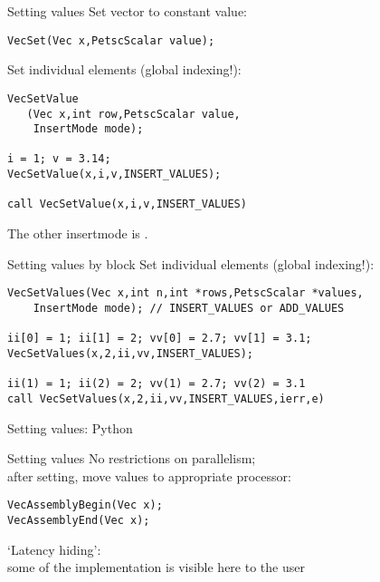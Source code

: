 \begin{numberedframe}{Setting values}
\small
Set vector to constant value:
\begin{lstlisting}
VecSet(Vec x,PetscScalar value);
\end{lstlisting}
Set individual elements (global indexing!):
\lstset{language=Fortran}
\begin{lstlisting}
VecSetValue
   (Vec x,int row,PetscScalar value,
    InsertMode mode);

i = 1; v = 3.14;
VecSetValue(x,i,v,INSERT_VALUES);

call VecSetValue(x,i,v,INSERT_VALUES)
\end{lstlisting}
The other insertmode is .
\end{numberedframe}

\lstset{language=C}

\begin{numberedframe}{Setting values by block}
Set individual elements (global indexing!):
\begin{lstlisting}
VecSetValues(Vec x,int n,int *rows,PetscScalar *values,
    InsertMode mode); // INSERT_VALUES or ADD_VALUES

ii[0] = 1; ii[1] = 2; vv[0] = 2.7; vv[1] = 3.1;
VecSetValues(x,2,ii,vv,INSERT_VALUES);

ii(1) = 1; ii(2) = 2; vv(1) = 2.7; vv(2) = 3.1
call VecSetValues(x,2,ii,vv,INSERT_VALUES,ierr,e)
\end{lstlisting}
\end{numberedframe}

\begin{python}
\begin{numberedframe}{Setting values: Python}
\end{numberedframe}
\end{python}

\begin{numberedframe}{Setting values}
No restrictions on parallelism;\\
after setting, move values to appropriate processor:
\begin{lstlisting}
VecAssemblyBegin(Vec x);
VecAssemblyEnd(Vec x);
\end{lstlisting}
`Latency hiding':\\
some of the implementation is visible here
to the user
\end{numberedframe}

